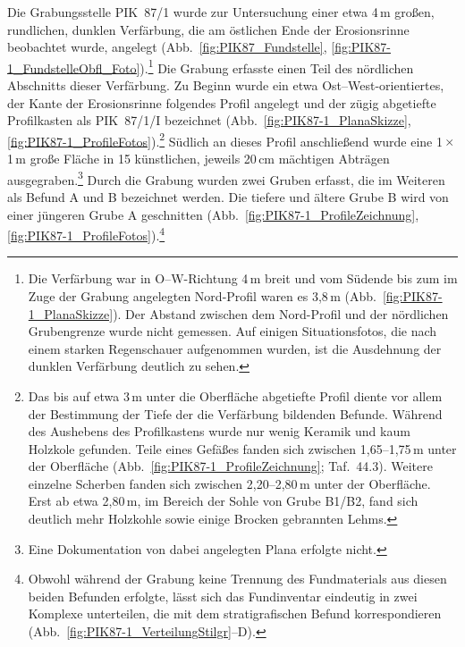Die Grabungsstelle PIK~87/1 wurde zur Untersuchung einer etwa 4\,m großen, rundlichen, dunklen Verfärbung, die am östlichen Ende der Erosionsrinne beobachtet wurde, angelegt (Abb.~\ref{fig:PIK87_Fundstelle}, \ref{fig:PIK87-1_FundstelleObfl_Foto}).\footnote{Die Verfärbung war in O--W-Richtung 4\,m breit und vom Südende bis zum im Zuge der Grabung angelegten Nord-Profil waren es 3,8\,m (Abb.~\ref{fig:PIK87-1_PlanaSkizze}). Der Abstand zwischen dem Nord-Profil und der nördlichen Grubengrenze wurde nicht gemessen. Auf einigen Situationsfotos, die nach einem starken Regenschauer aufgenommen wurden, ist die Ausdehnung der dunklen Verfärbung deutlich zu sehen.} Die Grabung erfasste einen Teil des nördlichen Abschnitts dieser Verfärbung. Zu Beginn wurde ein etwa Ost--West-orientiertes, der Kante der Erosionsrinne folgendes Profil angelegt und der zügig abgetiefte Profilkasten als PIK~87/1/I bezeichnet (Abb.~\ref{fig:PIK87-1_PlanaSkizze}, \ref{fig:PIK87-1_ProfileFotos}).\footnote{Das bis auf etwa 3\,m unter die Oberfläche abgetiefte Profil diente vor allem der Bestimmung der Tiefe der die Verfärbung bildenden Befunde. Während des Aushebens des Profilkastens wurde nur wenig Keramik und kaum Holzkole gefunden. Teile eines Gefäßes fanden sich zwischen 1,65--1,75\,m unter der Oberfläche (Abb.~\ref{fig:PIK87-1_ProfileZeichnung}; Taf.~44.3). Weitere einzelne Scherben fanden sich zwischen 2,20--2,80\,m unter der Oberfläche. Erst ab etwa 2,80\,m, im Bereich der Sohle von Grube B1/B2, fand sich deutlich mehr Holzkohle sowie einige Brocken gebrannten Lehms.} Südlich an dieses Profil anschließend wurde eine 1\,$\times$\,1\,m große Fläche in 15 künstlichen, jeweils 20\,cm mächtigen Abträgen ausgegraben.\footnote{Eine Dokumentation von dabei angelegten Plana erfolgte nicht.} Durch die Grabung wurden zwei Gruben erfasst, die im Weiteren als Befund A und B bezeichnet werden. Die tiefere und ältere Grube B wird von einer jüngeren Grube A geschnitten (Abb.~\ref{fig:PIK87-1_ProfileZeichnung}, \ref{fig:PIK87-1_ProfileFotos}).\footnote{Obwohl während der Grabung keine Trennung des Fundmaterials aus diesen beiden Befunden erfolgte, lässt sich das Fundinventar eindeutig in zwei Komplexe unterteilen, die mit dem stratigrafischen Befund korrespondieren (Abb.~\ref{fig:PIK87-1_VerteilungStilgr}--D).}

